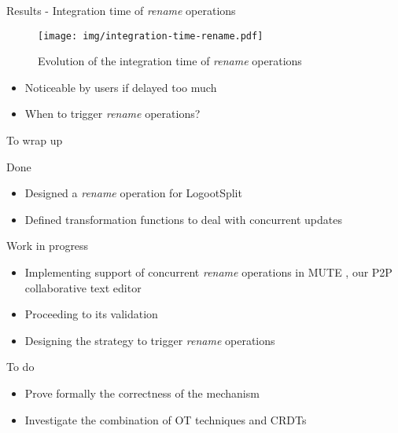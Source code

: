 \documentclass[10pt]{beamer}
\begin{document}
\begin{frame}{Results - Integration time of \emph{rename} operations}
  \begin{figure}
    \centering
    \texttt{[image: img/integration-time-rename.pdf]}
    \caption{Evolution of the integration time of \emph{rename} operations}
    \label{fig:evolution-integration-time-rename}
  \end{figure}

  \vspace{-1\baselineskip}
  \begin{itemize}
    \pause
    \item Noticeable by users if delayed too much
    \pause
    \item When to trigger \emph{rename} operations?
  \end{itemize}
\end{frame}

\begin{frame}{To wrap up}
  \begin{block}{Done}
    \vspace{-1mm}
    \begin{itemize}
      \item Designed a \emph{rename} operation for LogootSplit
      \item Defined transformation functions to deal with concurrent updates
    \end{itemize}
  \end{block}

  \pause

  \begin{block}{Work in progress}
    \vspace{-1mm}
    \begin{itemize}
      \item Implementing support of concurrent \emph{rename} operations in MUTE , our P2P collaborative text editor
      \item Proceeding to its validation
      \item Designing the strategy to trigger \emph{rename} operations
    \end{itemize}
  \end{block}

  \pause

  \begin{block}{To do}
    \vspace{-1mm}
    \begin{itemize}
      \item Prove formally the correctness of the mechanism
      \item Investigate the combination of OT techniques and CRDTs
    \end{itemize}
  \end{block}
\end{frame}
\end{document}
